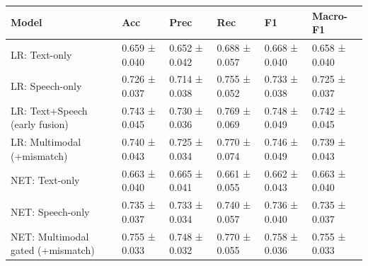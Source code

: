 \begin{tabular}{llllll}
\toprule
Model & Acc & Prec & Rec & F1 & Macro-F1 \\
\midrule
LR: Text-only & 0.659 ± 0.040 & 0.652 ± 0.042 & 0.688 ± 0.057 & 0.668 ± 0.040 & 0.658 ± 0.040 \\
LR: Speech-only & 0.726 ± 0.037 & 0.714 ± 0.038 & 0.755 ± 0.052 & 0.733 ± 0.038 & 0.725 ± 0.037 \\
LR: Text+Speech (early fusion) & 0.743 ± 0.045 & 0.730 ± 0.036 & 0.769 ± 0.069 & 0.748 ± 0.049 & 0.742 ± 0.045 \\
LR: Multimodal (+mismatch) & 0.740 ± 0.043 & 0.725 ± 0.034 & 0.770 ± 0.074 & 0.746 ± 0.049 & 0.739 ± 0.043 \\
NET: Text-only & 0.663 ± 0.040 & 0.665 ± 0.041 & 0.661 ± 0.055 & 0.662 ± 0.043 & 0.663 ± 0.040 \\
NET: Speech-only & 0.735 ± 0.037 & 0.733 ± 0.034 & 0.740 ± 0.057 & 0.736 ± 0.040 & 0.735 ± 0.037 \\
NET: Multimodal gated (+mismatch) & 0.755 ± 0.033 & 0.748 ± 0.032 & 0.770 ± 0.055 & 0.758 ± 0.036 & 0.755 ± 0.033 \\
\bottomrule
\end{tabular}
